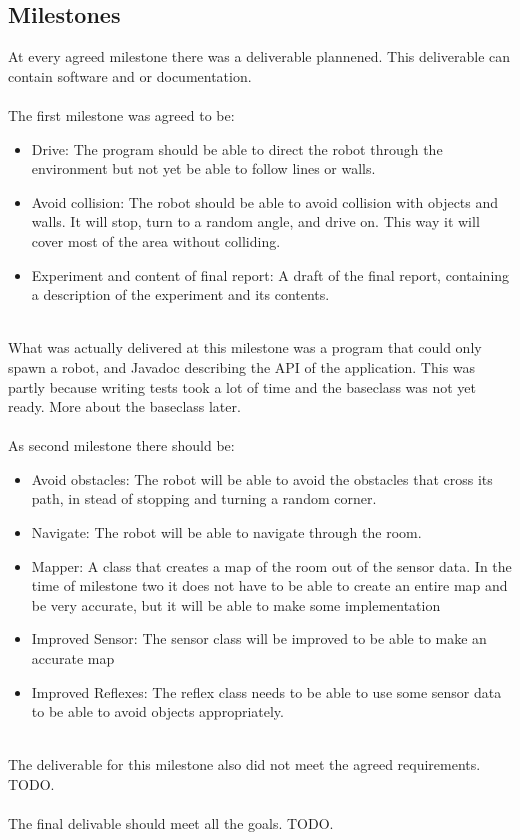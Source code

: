 \documentclass[a4paper,10pt]{article}
\begin{document}
\subsection{Milestones}
At every agreed milestone there was a deliverable plannened. This deliverable can contain software and or documentation.
\\\\
The first milestone was agreed to be:
\begin{itemize}
\item Drive: The program should be able to direct the robot through the environment but not yet be able to follow lines or walls.
\item Avoid collision: The robot should be able to avoid collision with objects and walls. It will stop, turn to a random angle, and drive on. This way it will cover most of the area without colliding.
\item Experiment and content of final report: A draft of the final report, containing a description of the experiment and its contents.
\end{itemize}
\\
What was actually delivered at this milestone was a program that could only spawn a robot, and Javadoc describing the API of the application. This was partly because writing tests took a lot of time and the baseclass was not yet ready. More about the baseclass later.
\\ \\
As second milestone there should be:
\begin{itemize}
\item Avoid obstacles: The robot will be able to avoid the obstacles that cross its path, in stead of stopping and turning a random corner.
\item Navigate: The robot will be able to navigate through the room.
\item Mapper: A class that creates a map of the room out of the sensor data. In the time of milestone two it does not have to be able to create an entire map and be very accurate, but it will be able to make some implementation
\item Improved Sensor: The sensor class will be improved to be able to make an accurate map
\item Improved Reflexes: The reflex class needs to be able to use some sensor data to be able to avoid objects appropriately.
\end{itemize}
\\
The deliverable for this milestone also did not meet the agreed requirements. TODO.
\\\\
The final delivable should meet all the goals. TODO.
\end{document}
